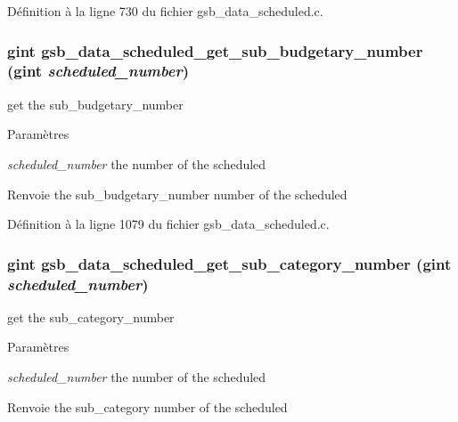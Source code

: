 Définition à la ligne 730 du fichier gsb\_\-data\_\-scheduled.c.

\subsubsection[{gsb\_\-data\_\-scheduled\_\-get\_\-sub\_\-budgetary\_\-number}]{\setlength{\rightskip}{0pt plus 5cm}gint gsb\_\-data\_\-scheduled\_\-get\_\-sub\_\-budgetary\_\-number (gint {\em scheduled\_\-number})}\label{gsb__data__scheduled_8h_a6e325242a5a8187b876eb57f6e1d10ed}
get the sub\_\-budgetary\_\-number


\begin{DoxyParams}{Paramètres}
\item[{\em scheduled\_\-number}]the number of the scheduled\end{DoxyParams}
\begin{DoxyReturn}{Renvoie}
the sub\_\-budgetary\_\-number number of the scheduled 
\end{DoxyReturn}


Définition à la ligne 1079 du fichier gsb\_\-data\_\-scheduled.c.

\subsubsection[{gsb\_\-data\_\-scheduled\_\-get\_\-sub\_\-category\_\-number}]{\setlength{\rightskip}{0pt plus 5cm}gint gsb\_\-data\_\-scheduled\_\-get\_\-sub\_\-category\_\-number (gint {\em scheduled\_\-number})}\label{gsb__data__scheduled_8h_a0f906373715193111c3dd1d6af30000a}
get the sub\_\-category\_\-number


\begin{DoxyParams}{Paramètres}
\item[{\em scheduled\_\-number}]the number of the scheduled\end{DoxyParams}
\begin{DoxyReturn}{Renvoie}
the sub\_\-category number of the scheduled 
\end{DoxyReturn}


